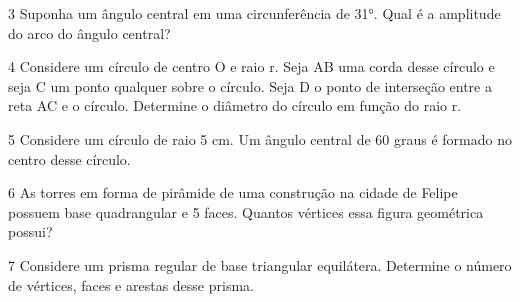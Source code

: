 \num{3} Suponha um ângulo central em uma circunferência de 31°. Qual é a
amplitude do arco do ângulo central?


\num{4} Considere um círculo de centro O e raio r. Seja AB uma corda desse
círculo e seja C um ponto qualquer sobre o círculo. Seja D o ponto de
interseção entre a reta AC e o círculo. Determine o diâmetro do círculo
em função do raio r.


\num{5} Considere um círculo de raio 5 cm. Um ângulo central de 60 graus é
formado no centro desse círculo.\enlargethispage{2\baselineskip}


\num{6} As torres em forma de pirâmide de uma construção na cidade de Felipe
possuem base quadrangular e 5 faces. Quantos vértices essa figura
geométrica possui?


\num{7} Considere um prisma regular de base triangular equilátera. Determine
o número de vértices, faces e arestas desse prisma.

